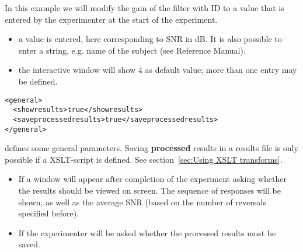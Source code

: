 In this example we will modify the gain of the filter with ID
 to a value that is entered by the experimenter at
the start of the experiment.

\begin{itemize}
\item {} a value is entered, here corresponding
to SNR in dB. It is also possible to enter a string, e.g. name of
the subject (see Reference Manual).

\item {} the interactive window will show 4 as
default value; more than one entry may be defined.
\end{itemize}




\begin{lstlisting}
<general>
  <showresults>true</showresults>
  <saveprocessedresults>true</saveprocessedresults>
</general>
\end{lstlisting}

 defines some general parameters. Saving
\textbf{processed} results in a results file is only possible if a
XSLT-script is defined. See section~\ref{sec:Using XSLT
transforms}.

\begin{itemize}
\item {} If  a window will appear
after completion of the experiment asking whether the results
should be viewed on screen. The sequence of responses will be
shown, as well as the average SNR (based on the number of
reversals specified before).

\item {} If  the
experimenter will be asked whether the processed results must be
saved.
\end{itemize}


  
